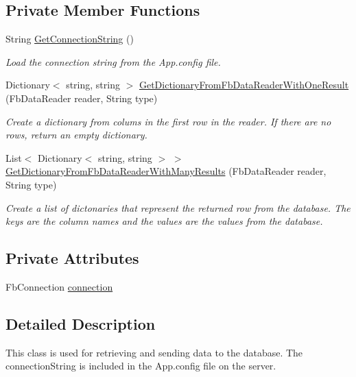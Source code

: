 \subsection*{Private Member Functions}
\begin{DoxyCompactItemize}
\item 
String \hyperlink{class_e_l_i_server_1_1_database_manager_a2a2f09721d3e5ea9db778d74e517e8da}{Get\+Connection\+String} ()
\begin{DoxyCompactList}\small\item\em Load the connection string from the App.\+config file. \end{DoxyCompactList}\item 
Dictionary$<$ string, string $>$ \hyperlink{class_e_l_i_server_1_1_database_manager_a4ccfa58357d3f8e7fd495f78a117856e}{Get\+Dictionary\+From\+Fb\+Data\+Reader\+With\+One\+Result} (Fb\+Data\+Reader reader, String type)
\begin{DoxyCompactList}\small\item\em Create a dictionary from colums in the first row in the reader. If there are no rows, return an empty dictionary. \end{DoxyCompactList}\item 
List$<$ Dictionary$<$ string, string $>$ $>$ \hyperlink{class_e_l_i_server_1_1_database_manager_a9732d7fca81399afcb1ad6f5f01a42f3}{Get\+Dictionary\+From\+Fb\+Data\+Reader\+With\+Many\+Results} (Fb\+Data\+Reader reader, String type)
\begin{DoxyCompactList}\small\item\em Create a list of dictonaries that represent the returned row from the database. The keys are the column names and the values are the values from the database. \end{DoxyCompactList}\end{DoxyCompactItemize}
\subsection*{Private Attributes}
\begin{DoxyCompactItemize}
\item 
Fb\+Connection \hyperlink{class_e_l_i_server_1_1_database_manager_a34b35f163316da5270e526b1d0f51889}{connection}
\end{DoxyCompactItemize}


\subsection{Detailed Description}
This class is used for retrieving and sending data to the database. The connection\+String is included in the App.\+config file on the server. 



